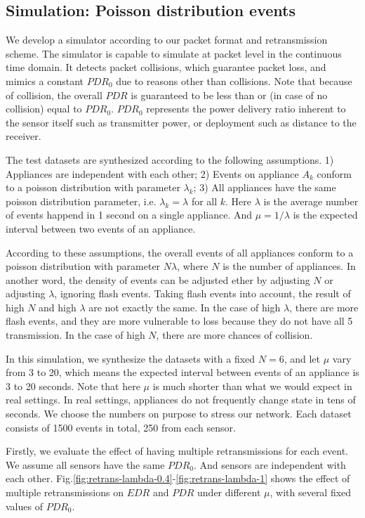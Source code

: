 \subsection{Simulation: Poisson distribution events}

We develop a simulator according to our packet format and retransmission scheme. The simulator is capable to simulate at packet level in the continuous time domain. It detects packet collisions, which guarantee packet loss, and mimics a constant $PDR_0$ due to reasons other than collisions. Note that because of collision, the overall $PDR$ is guaranteed to be less than or (in case of no collision) equal to $PDR_0$. $PDR_0$ represents the power delivery ratio inherent to the sensor itself such as transmitter power, or deployment such as distance to the receiver. 

The test datasets are synthesized according to the following assumptions. 1) Appliances are independent with each other; 2) Events on appliance $A_k$ conform to a poisson distribution with parameter $\lambda_k$; 3) All appliances have the same poisson distribution parameter, i.e. $\lambda_k = \lambda$ for all $k$. Here $\lambda$ is the average number of events happend in 1 second on a single appliance. And $\mu = 1/\lambda$ is the expected interval between two events of an appliance. 

According to these assumptions, the overall events of all appliances conform to a poisson distribution with parameter $N\lambda$, where $N$ is the number of appliances. In another word, the density of events can be adjusted ether by adjusting $N$ or adjusting $\lambda$, ignoring flash events. Taking flash events into account, the result of high $N$ and high $\lambda$ are not exactly the same. In the case of high $\lambda$, there are more flash events, and they are more vulnerable to loss because they do not have all 5 transmission. In the case of high $N$, there are more chances of collision. 

In this simulation, we synthesize the datasets with a fixed $N=6$, and let $\mu$ vary from 3 to 20, which means the expected interval between events of an appliance is 3 to 20 seconds. Note that here $\mu$ is much shorter than what we would expect in real settings. In real settings, appliances do not frequently change state in tens of seconds. We choose the numbers on purpose to stress our network. Each dataset consists of 1500 events in total, 250 from each sensor. 

Firstly, we evaluate the effect of having multiple retransmissions for each event. We assume all sensors have the same $PDR_0$. And sensors are independent with each other. Fig.\ref{fig:retrans-lambda-0.4}-\ref{fig:retrans-lambda-1} shows the effect of multiple retransmissions on $EDR$ and $PDR$ under different $\mu$, with several fixed values of $PDR_0$. 

